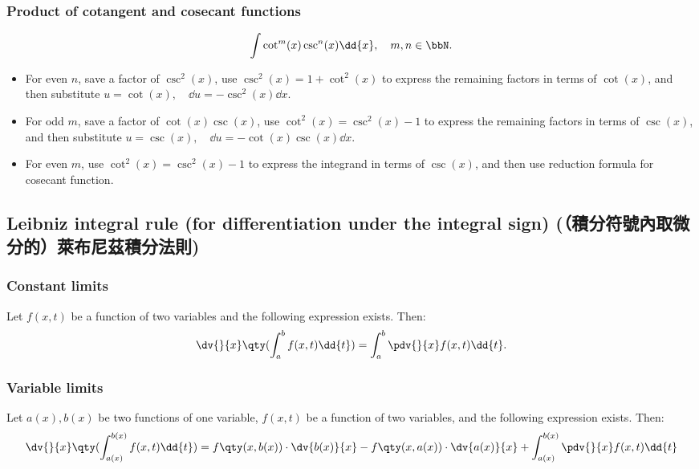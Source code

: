 \subsubsection{Product of cotangent and cosecant functions}
\[\int\cot^m(x)\csc^n(x)\dd{x},\quad m,n\in\bbN.\]
\begin{itemize}
\item For even $n$, save a factor of $\csc^2(x)$, use $\csc^2(x)=1+\cot^2(x)$ to express the remaining factors in terms of $\cot(x)$, and then substitute $u=\cot(x),\quad\dd{u}=-\csc^2(x)\dd{x}$.
\item For odd $m$, save a factor of $\cot(x)\csc(x)$, use $\cot^2(x)=\csc^2(x)-1$ to express the remaining factors in terms of $\csc(x)$, and then substitute $u=\csc(x),\quad\dd{u}=-\cot(x)\csc(x)\dd{x}$.
\item For even $m$, use $\cot^2(x)=\csc^2(x)-1$ to express the integrand in terms of $\csc(x)$, and then use reduction formula for cosecant function.
\end{itemize}
\subsection{Leibniz integral rule (for differentiation under the integral sign) (（積分符號內取微分的）萊布尼茲積分法則)}
\subsubsection{Constant limits}
Let $f(x,t)$ be a function of two variables and the following expression exists. Then:
\[\dv{}{x}\qty(\int_a^bf(x,t)\dd{t})=\int_a^b\pdv{}{x}f(x,t)\dd{t}.\]
\subsubsection{Variable limits}
Let $a(x),b(x)$ be two functions of one variable, $f(x,t)$ be a function of two variables, and the following expression exists. Then:
\[\dv{}{x}\qty(\int_{a(x)}^{b(x)}f(x,t)\dd{t})=f\qty(x,b(x))\cdot\dv{b(x)}{x}-f\qty(x,a(x))\cdot\dv{a(x)}{x}+\int_{a(x)}^{b(x)}\pdv{}{x}f(x,t)\dd{t}\]
